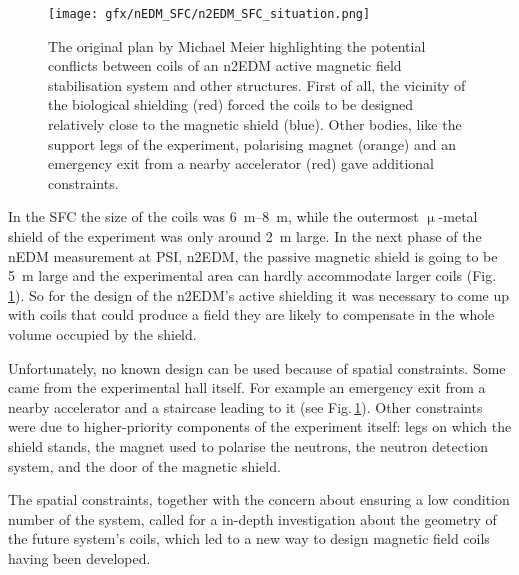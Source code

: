 \begin{figure}
  \centering
  \texttt{[image: gfx/nEDM\_SFC/n2EDM\_SFC\_situation.png]}
  \caption{The original plan by Michael Meier highlighting the potential conflicts between coils of an n2EDM active magnetic field stabilisation system and other structures. First of all, the vicinity of the biological shielding (red) forced the coils to be designed relatively close to the magnetic shield (blue). Other bodies, like the support legs of the experiment, polarising magnet (orange) and an emergency exit from a nearby accelerator (red) gave additional constraints.}\label{fig:n2EDM_sfc_situational_plan}
\end{figure}

In the SFC the size of the coils was \SIrange[range-phrase = --, range-units=single]{6}{8}{\meter}, while the outermost $\upmu$-metal shield of the experiment was only around \SI{2}{\meter} large. In the next phase of the nEDM measurement at PSI, n2EDM, the passive magnetic shield is going to be \SI{5}{\meter} large and the experimental area can hardly accommodate larger coils (Fig.\,\ref{fig:n2EDM_sfc_situational_plan}). So for the design of the n2EDM's active shielding it was necessary to come up with coils that could produce a field they are likely to compensate in the whole volume occupied by the shield.

Unfortunately, no known design can be used because of spatial constraints. Some came from the experimental hall itself. For example an emergency exit from a nearby accelerator and a staircase leading to it (see Fig.\,\ref{fig:n2EDM_sfc_situational_plan}). Other constraints were due to higher-priority components of the experiment itself: legs on which the shield stands, the magnet used to polarise the neutrons, the neutron detection system, and the door of the magnetic shield.

The spatial constraints, together with the concern about ensuring a low condition number of the system, called for a in-depth investigation about the geometry of the future system's coils, which led to a new way to design magnetic field coils having been developed.